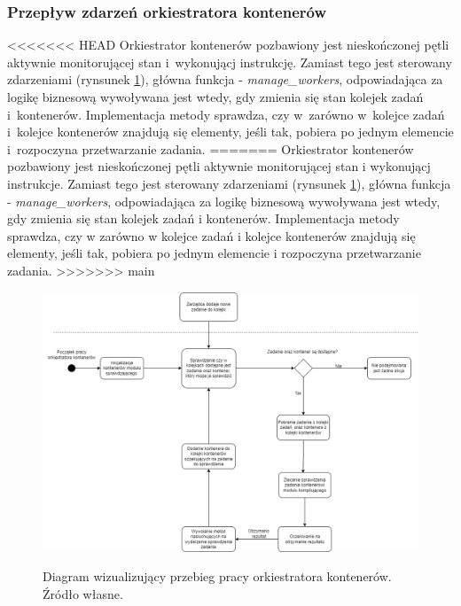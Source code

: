 \subsubsection{Przepływ zdarzeń orkiestratora kontenerów}
<<<<<<< HEAD
Orkiestrator kontenerów pozbawiony jest nieskończonej pętli aktywnie monitorującej stan i~wykonującj instrukcję. Zamiast tego jest sterowany zdarzeniami (rynsunek \ref{fig:scheduler-activity-diagram}), główna funkcja - \textit{manage\_workers}, odpowiadająca za logikę biznesową wywoływana jest wtedy, gdy zmienia się stan kolejek zadań i~kontenerów. Implementacja metody sprawdza, czy w~zarówno w~kolejce zadań i~kolejce kontenerów znajdują się elementy, jeśli tak, pobiera po jednym elemencie i~rozpoczyna przetwarzanie zadania.
=======
Orkiestrator kontenerów pozbawiony jest nieskończonej pętli aktywnie monitorującej stan i wykonującj instrukcje. Zamiast tego jest sterowany zdarzeniami (rynsunek \ref{fig:scheduler-activity-diagram}), główna funkcja - \textit{manage\_workers}, odpowiadająca za logikę biznesową wywoływana jest wtedy, gdy zmienia się stan kolejek zadań i kontenerów. Implementacja metody sprawdza, czy w zarówno w kolejce zadań i kolejce kontenerów znajdują się elementy, jeśli tak, pobiera po jednym elemencie i rozpoczyna przetwarzanie zadania.
>>>>>>> main

\begin{figure}[!ht]
	\begin{center}
		\resizebox{1\textwidth}{!} {
			\includegraphics{img/3/orkiestrator-kontenerow-diagram-aktywnosci.png}
		}
		\caption[Diagram aktywności orkiestratora kontenerów]{Diagram wizualizujący przebieg pracy orkiestratora kontenerów. Źródło własne.}
		\label{fig:scheduler-activity-diagram}
	\end{center}
\end{figure}

